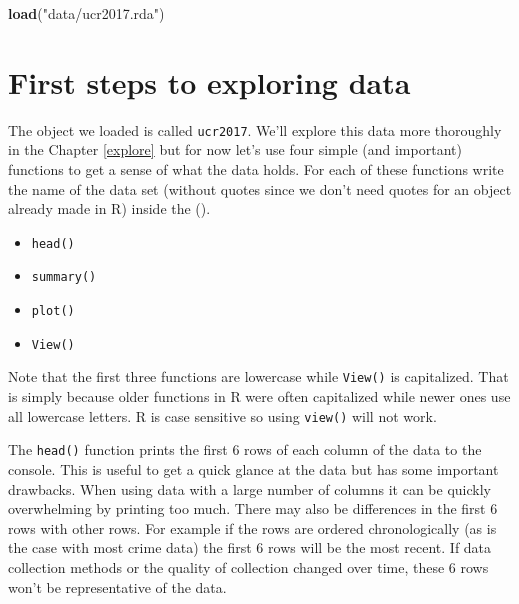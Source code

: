 \documentclass[
  12pt,
]{book}
\newenvironment{Shaded}{\begin{snugshade}}{\end{snugshade}}
\newcommand{\KeywordTok}[1]{\textcolor[rgb]{0.13,0.29,0.53}{\textbf{#1}}}
\newcommand{\NormalTok}[1]{#1}
\newcommand{\StringTok}[1]{\textcolor[rgb]{0.31,0.60,0.02}{#1}}
\providecommand{\tightlist}{%
  \setlength{\itemsep}{0pt}\setlength{\parskip}{0pt}}
\begin{document}
\begin{Shaded}
\begin{Highlighting}[]
\KeywordTok{load}\NormalTok{(}\StringTok{"data/ucr2017.rda"}\NormalTok{)}
\end{Highlighting}
\end{Shaded}

\hypertarget{first-steps-to-exploring-data}{%
\section{First steps to exploring data}\label{first-steps-to-exploring-data}}

The object we loaded is called \texttt{ucr2017}. We'll explore this data more thoroughly in the Chapter \ref{explore} but for now let's use four simple (and important) functions to get a sense of what the data holds. For each of these functions write the name of the data set (without quotes since we don't need quotes for an object already made in R) inside the ().

\begin{itemize}
\tightlist
\item
  \texttt{head()}
\item
  \texttt{summary()}
\item
  \texttt{plot()}
\item
  \texttt{View()}
\end{itemize}

Note that the first three functions are lowercase while \texttt{View()} is capitalized. That is simply because older functions in R were often capitalized while newer ones use all lowercase letters. R is case sensitive so using \texttt{view()} will not work.

The \texttt{head()} function prints the first 6 rows of each column of the data to the console. This is useful to get a quick glance at the data but has some important drawbacks. When using data with a large number of columns it can be quickly overwhelming by printing too much. There may also be differences in the first 6 rows with other rows. For example if the rows are ordered chronologically (as is the case with most crime data) the first 6 rows will be the most recent. If data collection methods or the quality of collection changed over time, these 6 rows won't be representative of the data.
\end{document}
